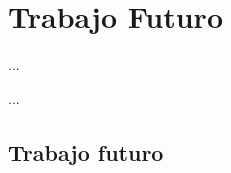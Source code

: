 \chapter{Trabajo Futuro}

\begin{FraseCelebre}
\begin{Frase}
...
\end{Frase}
\begin{Fuente}
...
\end{Fuente}
\end{FraseCelebre}
\section{Trabajo futuro}
\label{cap34:sec:futuro}
